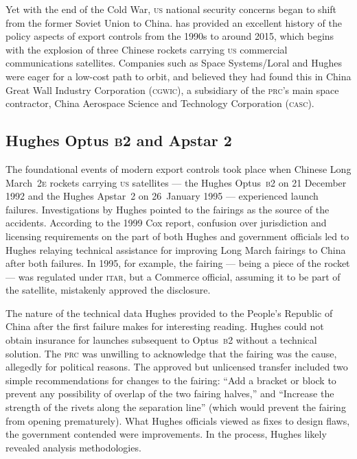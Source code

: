 \documentclass[preprint,twocolumn,5p]{elsarticle}
\begin{document}
Yet with the end of the Cold War, \textsc{us} national security concerns began to shift from the former Soviet Union to China. \citet{Zinger2015} has provided an excellent history of the policy aspects of export controls from the 1990s to around 2015, which begins with the explosion of three Chinese rockets carrying \textsc{us} commercial communications satellites. Companies such as Space Systems/Loral and Hughes were eager for a low-cost path to orbit, and believed they had found this in China Great Wall Industry Corporation (\textsc{cgwic}), a subsidiary of the \textsc{prc}'s main space contractor, China Aerospace Science and Technology Corporation (\textsc{casc}).

\subsection{Hughes Optus \textsc{b2} and Apstar 2}
The foundational events of modern export controls took place when Chinese Long March~\textsc{2e} rockets carrying \textsc{us} satellites --- the Hughes Optus~\textsc{b2} on 21 December 1992 and the Hughes Apstar~2 on 26~January 1995 --- experienced launch failures. Investigations by Hughes pointed to the fairings as the source of the accidents. According to the 1999 Cox report, confusion over jurisdiction and licensing requirements on the part of both Hughes and government officials led to Hughes relaying technical assistance for improving Long March fairings to China after both failures. In 1995, for example, the fairing --- being a piece of the rocket --- was regulated under \textsc{itar}, but a Commerce official, assuming it to be part of the satellite, mistakenly approved the disclosure. \citep{Cox1999} %

The nature of the technical data Hughes provided to the People's Republic of China after the first failure makes for interesting reading. Hughes could not obtain insurance for launches subsequent to Optus~\textsc{b2} without a technical solution. The \textsc{prc} was unwilling to acknowledge that the fairing was the cause, allegedly for political reasons. The approved but unlicensed transfer included two simple recommendations for changes to the fairing: ``Add a bracket or block to prevent any possibility of overlap of the two fairing halves,'' and ``Increase the strength of the rivets along the separation line'' (which would prevent the fairing from opening prematurely). What Hughes officials viewed as fixes to design flaws, the government contended were improvements. In the process, Hughes likely revealed analysis methodologies. \citep{Cox1999} %
\end{document}
